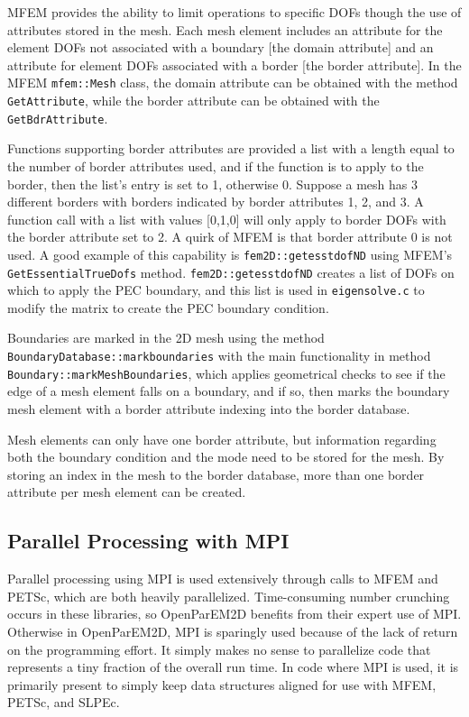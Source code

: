 \documentclass[titlepage]{article}
\renewcommand\_{\textunderscore\linebreak[1]}
\begin{document}
MFEM provides the ability to limit operations to specific DOFs though the use of attributes stored in the mesh.  Each mesh element includes an attribute for the element DOFs not associated with a boundary [the domain attribute] and an attribute for element DOFs associated with a border [the border attribute]. In the MFEM \texttt{mfem::Mesh} class, the domain attribute can be obtained with the method \texttt{GetAttribute}, while the border attribute can be obtained with the \texttt{GetBdrAttribute}.

Functions supporting border attributes are provided a list with a length equal to the number of border attributes used, and if the function is to apply to the border, then the list's entry is set to 1, otherwise 0.  Suppose a mesh has 3 different borders with borders indicated by border attributes 1, 2, and 3.  A function call with a list with values [0,1,0] will only apply to border DOFs with the border attribute set to 2.  A quirk of MFEM is that border attribute 0 is not used.
A good example of this capability is \texttt{fem2D::get\_ess\_tdof\_ND} using MFEM's \texttt{GetEssentialTrueDofs} method. \texttt{fem2D::get\_ess\_tdof\_ND} creates a list of DOFs on which to apply the PEC boundary, and this list is used in \texttt{eigensolve.c} to modify the matrix to create the PEC boundary condition.

Boundaries are marked in the 2D mesh using the method \texttt{BoundaryDatabase::mark\_boundaries} with the main functionality in method \texttt{Boundary::markMeshBoundaries}, which applies geometrical checks to see if the edge of a mesh element falls on a boundary, and if so, then marks the boundary mesh element with a border attribute indexing into the border database.

Mesh elements can only have one border attribute, but information regarding both the boundary condition and the mode need to be stored for the mesh.  By storing an index in the mesh to the border database, more than one border attribute per mesh element can be created.

\subsection{Parallel Processing with MPI}

Parallel processing using MPI is used extensively through calls to MFEM and PETSc, which are both heavily parallelized.  Time-consuming number crunching occurs in these libraries, so OpenParEM2D benefits from their expert use of MPI.  Otherwise in OpenParEM2D, MPI is sparingly used because of the lack of return on the programming effort.  It simply makes no sense to parallelize code that represents a tiny fraction of the overall run time. In code where MPI is used, it is primarily present to simply keep data structures aligned for use with MFEM, PETSc, and SLPEc.
\end{document}
